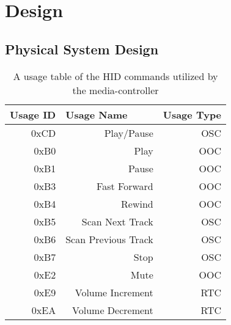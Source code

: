 \documentclass{article}
\begin{document}

	
	\section{Design}
		\subsection{Physical System Design}
			\lipsum[1]
			
			\begin{table}[h]
				\centering
				\caption{A usage table of the HID commands utilized by the media-controller}
				\label{my-label}
				\begin{tabular}{|r|r|r|}
					\hline
					\multicolumn{1}{|l|}{Usage ID} & \multicolumn{1}{l|}{Usage Name} & \multicolumn{1}{l|}{Usage Type} \\ \hline
					0xCD                           & Play/Pause                      & OSC                             \\
					0xB0                           & Play                            & OOC                             \\
					0xB1                           & Pause                           & OOC                             \\
					0xB3                           & Fast Forward                    & OOC                             \\
					0xB4                           & Rewind                          & OOC                             \\
					0xB5                           & Scan Next Track                 & OSC                             \\
					0xB6                           & Scan Previous Track             & OSC                             \\
					0xB7                           & Stop                            & OSC                             \\
					0xE2                           & Mute                            & OOC                             \\
					0xE9                           & Volume Increment                & RTC                             \\
					0xEA                           & Volume Decrement                & RTC                             \\ \hline
				\end{tabular}
			\end{table}
		
\end{document}
